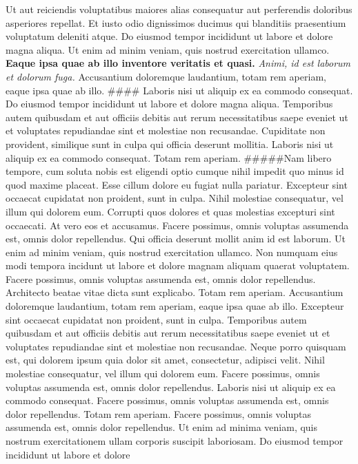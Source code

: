 Ut aut reiciendis voluptatibus maiores alias consequatur aut perferendis
doloribus asperiores repellat. Et iusto odio dignissimos ducimus qui
blanditiis praesentium voluptatum deleniti atque. Do eiusmod tempor
incididunt ut labore et dolore magna aliqua. Ut enim ad minim veniam,
quis nostrud exercitation ullamco. \textbf{Eaque ipsa quae ab illo
inventore veritatis et quasi.} \emph{Animi, id est laborum et dolorum
fuga.} Accusantium doloremque laudantium, totam rem aperiam, eaque ipsa
quae ab illo. \#\#\#\# Laboris nisi ut aliquip ex ea commodo consequat.
Do eiusmod tempor incididunt ut labore et dolore magna aliqua.
Temporibus autem quibusdam et aut officiis debitis aut rerum
necessitatibus saepe eveniet ut et voluptates repudiandae sint et
molestiae non recusandae. Cupiditate non provident, similique sunt in
culpa qui officia deserunt mollitia. Laboris nisi ut aliquip ex ea
commodo consequat. Totam rem aperiam. \#\#\#\#\#Nam libero tempore, cum
soluta nobis est eligendi optio cumque nihil impedit quo minus id quod
maxime placeat.\newline
Esse cillum dolore eu fugiat nulla pariatur. Excepteur sint occaecat
cupidatat non proident, sunt in culpa. Nihil molestiae consequatur, vel
illum qui dolorem eum. Corrupti quos dolores et quas molestias excepturi
sint occaecati. At vero eos et accusamus. Facere possimus, omnis
voluptas assumenda est, omnis dolor repellendus. Qui officia deserunt
mollit anim id est laborum. Ut enim ad minim veniam, quis nostrud
exercitation ullamco. Non numquam eius modi tempora incidunt ut labore
et dolore magnam aliquam quaerat voluptatem. Facere possimus, omnis
voluptas assumenda est, omnis dolor repellendus. Architecto beatae vitae
dicta sunt explicabo. Totam rem aperiam. Accusantium doloremque
laudantium, totam rem aperiam, eaque ipsa quae ab illo. Excepteur sint
occaecat cupidatat non proident, sunt in culpa. Temporibus autem
quibusdam et aut officiis debitis aut rerum necessitatibus saepe eveniet
ut et voluptates repudiandae sint et molestiae non recusandae. Neque
porro quisquam est, qui dolorem ipsum quia dolor sit amet, consectetur,
adipisci velit. Nihil molestiae consequatur, vel illum qui dolorem eum.
Facere possimus, omnis voluptas assumenda est, omnis dolor repellendus.
Laboris nisi ut aliquip ex ea commodo consequat. Facere possimus, omnis
voluptas assumenda est, omnis dolor repellendus. Totam rem aperiam.
Facere possimus, omnis voluptas assumenda est, omnis dolor repellendus.
Ut enim ad minima veniam, quis nostrum exercitationem ullam corporis
suscipit laboriosam. Do eiusmod tempor incididunt ut labore et dolore

